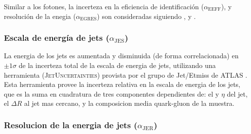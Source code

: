 





Similar a los fotones, la incerteza en la eficiencia de identificación ($\alpha_\text{EEFF}$), y resolución de
la enegia ($\alpha_\text{EGRES}$) son consideradas siguiendo \cite{EleEffTwiki}, \cite{EGScaleTwiki}
y \cite{MCPTwiki}.





\subsubsection{Escala de energía de jets ($\alpha_\mathrm{JES}$)}

La energia de los jets es aumentada y disminuida (de forma correlacionada) en
$\pm1\sigma$ de la incerteza total de la escala de energia de jets, utilizando
una herramienta (\textsc{JetUncertainties}) provista por el grupo de Jet/Etmiss de ATLAS \cite{JesTwiki}.
Esta herramienta provee la incerteza relativa en la escala de energia de los jets,
que es la suma en cuadratura de tres componentes dependientes de: el {\pt} y $\eta$
del jet, el $\Delta R$ al jet mas cercano, y la composicion media quark-gluon de la muestra.



\subsubsection{Resolucion de la energia de jets ($\alpha_\mathrm{JER}$)}

